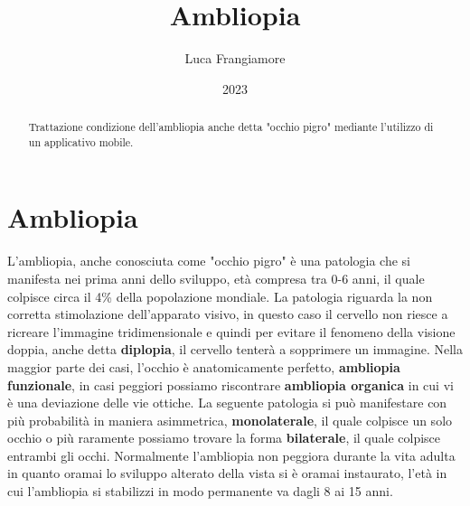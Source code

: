 \documentclass[10pt,a4paper]{article}
\title{Ambliopia}
\author{Luca Frangiamore}
\date{2023}
\begin{document}
	
	\maketitle
	\tableofcontents{\tiny }
	
	
	\begin{abstract}
		Trattazione condizione dell'ambliopia anche detta "occhio pigro" mediante l'utilizzo di un applicativo mobile.
	\end{abstract}
	 \newpage
	\section {Ambliopia}
	L'ambliopia, anche conosciuta come "occhio pigro" è una patologia che si manifesta nei prima anni dello sviluppo, età compresa tra 0-6 anni, il quale colpisce circa il 4\% della popolazione mondiale.
	La patologia riguarda la non corretta stimolazione dell'apparato visivo, in questo caso il cervello non riesce a ricreare l'immagine tridimensionale e quindi per evitare il fenomeno della visione doppia, anche detta \textbf{diplopia}, il cervello tenterà a sopprimere un immagine.
	Nella maggior parte dei casi, l'occhio è anatomicamente perfetto, \textbf{ambliopia funzionale}, in casi peggiori possiamo riscontrare \textbf{ambliopia organica} in cui vi è una deviazione delle vie ottiche.
	La seguente patologia si può manifestare con più probabilità in maniera asimmetrica, \textbf{monolaterale}, il quale colpisce un solo occhio o più raramente possiamo trovare la forma \textbf{bilaterale}, il quale colpisce entrambi gli occhi.
	Normalmente l'ambliopia non peggiora durante la vita adulta in quanto oramai lo sviluppo alterato della vista si è oramai instaurato, l'età in cui l'ambliopia si stabilizzi in modo permanente va dagli 8 ai 15 anni.
\end{document}
